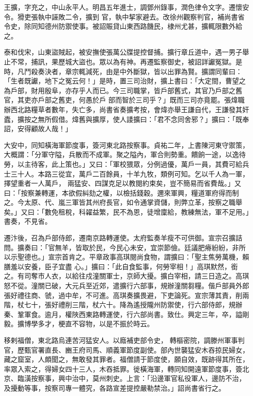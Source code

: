 \begin{pinyinscope}
 王擴，字充之，中山永平人。明昌五年進士，調鄧州錄事，潤色律令文字。遷懷安令。猾吏張執中誣敗二令，擴到
 官，執中挈家避去。改徐州觀察判官，補尚書省令史，除同知德州防禦使事。被詔賑貸山東西路饑民，棣州尤甚，擴輒限數外給之。



 泰和伐宋，山東盜賊起，被安撫使張萬公牒提控督捕。擴行章丘道中，遇一男子舉止不常，捕訊，果歷城大盜也。眾以為有神。再遷監察御史，被詔詳讞冤獄。是時，凡鬥殺奏決者，章宗輒減死，由是中外斷獄，皆以出罪為賢。擴謂同輩曰：「生者既讞，地下之冤云何！」是時，置三司治財，擴上書曰：「大定間，曹望之為戶部，財用殷阜，亦存乎人而已。今三司職掌，皆戶部舊式，其官乃戶部之舊官，其吏亦戶部之舊吏，何愚於戶
 部而智於三司乎？」既而三司亦竟罷。張煒職辦西北路糧草者數年，失亡多，尚書省奏擴考按，會煒亦舉王謙自代，王謙發其奸蠹，擴按之無所假借。煒舊與擴厚，使人諉擴曰：「君不念同舍邪？」擴曰：「既奉詔，安得顧故人哉！」



 大安中，同知橫海軍節度事，簽河東北路按察事。貞祐二年，上書陳河東守禦策，大概謂：「分軍守隘，兵散而不成軍。聚之隘內，軍合則勢重。饋餉一途，以逸待勞，以主待客，此上策也。」又曰：「軍校猥眾，分例過優，萬戶一員，其費可給兵士三十人。本路三從宜，萬戶二百餘員，十羊九牧，類例可知。乞以千人為一軍，擇望重者一人萬戶，
 兩猛安、四謀克足以教閱約束矣，豈不簡易而省費哉。」又曰：「按察兼轉運，本欲假糾劾之權，以檢括錢穀。邇來軍興，糧道軍府得而制之。今太原、代、嵐三軍皆其州府長官，如令通掌資儲，則弊立革，按察之職舉矣。」又曰：「數免租稅，科糴益繁，民不為恩，徒增廩給，教練無法，軍不足用。」書奏，不見省。



 遷汴後，召為戶部侍郎，遷南京路轉運使。太府監奏羊瘦不可供御。宣宗召擴詰問。擴奏曰：「官無羊，皆取於民，今民心未安，宜崇節儉。廷議肥瘠紛紛，非所以示聖德也。」宣宗首肯之。平章政事高琪閱尚食物，謂擴曰：「聖主焦勞萬機，賴膳羞以安養，臣子宜盡
 心。」擴曰：「此自食監事，何勞宰相！」高琪默然，銜之。有司奪市人衣，以給往戍潼關軍士，京師大擾。擴白宰相，請三日造之。高琪怒不從。潼關已破，大元兵至近郊，遣擴行六部事，規辦潼關芻糧。偕戶部員外郎張好禮往商、虢，過中牟，不可進。高琪奏擴畏避，下吏論死。宣宗薄其責，削兩階，杖七十，張好禮削三階，杖六十。降為遙授隴州防禦使，行六部侍郎，規辦秦、鞏軍食。逾月，權陜西東路轉運使，行六部尚書。致仕。興定三年，卒，謚剛毅。擴博學多才，梗直不容物，以是不振於時云。



 移剌福僧，東北路烏連苦河猛安人。以廕補吏部令史，
 轉樞密院，調滕州軍事判官，歷甄官署直長、豳王府司馬、順義軍節度副使。部內世襲猛安木吞掠民婦女，藏之窟室，人頗聞之，無敢發其罪者。福僧請于節度使，願自效，既跡得其所在，率眾入索之，得婦女四十三人，木吞抵罪。徙橫海軍，轉同知開遠軍節度事，簽北京、臨潢按察事，興中治中，莫州刺史。上言：「沿邊軍官私役軍人，邊防不治，及擾動等事，按察司專一體究，各路宣差提控嚴勒禁治。」詔尚書省行之。




\end{pinyinscope}
